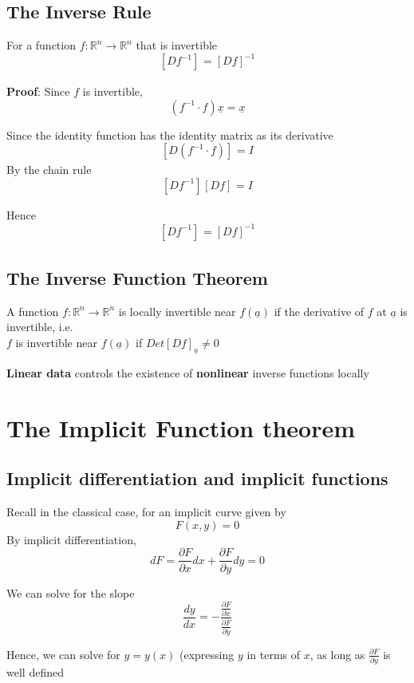 \subsection{The Inverse Rule}
\begin{framed}
   For a function $f: \mathbb{R}^n \to \mathbb{R}^n$ that is invertible
   \[
      \left[ D f^{-1} \right]_{} = \left[ D f \right]_{}^{-1}
   \] 
\end{framed}

\textbf{Proof}:
Since $f$ is invertible, \[
   (f^{-1} \cdot f) \underline{x} = \underline{x}
\] 

Since the identity function has the identity matrix as its derivative
\[
   \left[ D \left(f^{-1} \cdot f  \right)  \right]_{}  = I
\] 
By the chain rule
\[
   \left[ D f^{-1} \right]_{}  \left[ D f \right]_{} = I
\] 

Hence \[
   \left[ D f^{-1} \right]_{}  = \left[ D f \right]_{}^{-1}
\] 

\subsection{The Inverse Function Theorem}

\begin{framed}
   A function  $f: \mathbb{R}^n \to \mathbb{R}^n$ is locally invertible near $f( \underline{a})$ if the derivative of $f$ at $ \underline{a} $ is invertible, i.e. \\

   $f$ is invertible near $f( \underline{a})$ if $Det \left[ D f \right]_{ \underline{a}} \neq 0 $

   \textbf{Linear data} controls the existence of \textbf{nonlinear} inverse functions locally
\end{framed}

\section{The Implicit Function theorem}

\subsection{Implicit differentiation and implicit functions}
\begin{framed}
   Recall in the classical case, for an implicit curve given by \[
     F(x, y) = 0
   \] 
   By implicit differentiation, \[
     dF = \frac{\partial F}{\partial x} dx + \frac{\partial F}{\partial y} dy = 0
   \] 

   We can solve for the slope \[
     \frac{dy}{dx} = -\frac{ \frac{\partial F}{\partial x}}{ \frac{\partial F}{\partial y}}
   \] 

   Hence, we can solve for $y = y(x)$ (expressing $y$ in terms of $x$, as long as $ \frac{\partial F}{\partial y}$ is well defined
\end{framed}

